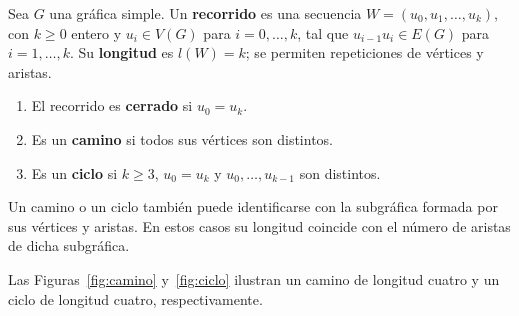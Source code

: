 \begin{definition}
\label{def:caminos-ciclos}
Sea $G$ una gráfica simple. Un \textbf{recorrido} es una secuencia $W=(u_0,u_1,\ldots,u_k)$, con $k\geq0$ entero y $u_i\in V(G)$ para $i=0,\ldots,k$, tal que $u_{i-1}u_i\in E(G)$ para $i=1,\ldots,k$. Su \textbf{longitud} es $l(W)=k$; se permiten repeticiones de vértices y aristas.
\begin{enumerate}
    \item El recorrido es \textbf{cerrado} si $u_0=u_k$.
    \item Es un \textbf{camino} si todos sus vértices son distintos.
    \item Es un \textbf{ciclo} si $k\geq3$, $u_0=u_k$ y $u_0,\ldots,u_{k-1}$ son distintos.
\end{enumerate}
Un camino o un ciclo también puede identificarse con la subgráfica formada por sus vértices y aristas. En estos casos su longitud coincide con el número de aristas de dicha subgráfica.
\end{definition}

Las Figuras~\ref{fig:camino} y~\ref{fig:ciclo} ilustran un camino de longitud cuatro y un ciclo de longitud cuatro, respectivamente.


